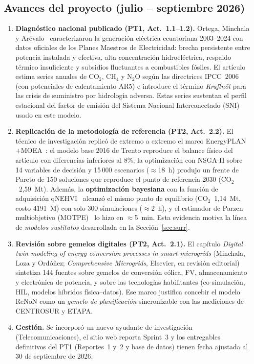 \documentclass[11pt,a4paper]{article}
\newcommand{\CO}{CO$_2$}
\begin{document}
\subsection{Avances del proyecto (julio -- septiembre 2026)}
\begin{enumerate}[leftmargin=1.6em]
  \item \textbf{Diagn\'ostico nacional publicado (PT1, Act.~1.1--1.2).} Ortega, Minchala y
  Ar\'evalo~\cite{ortega2026} caracterizaron la generaci\'on el\'ectrica ecuatoriana
  2003--2024 con datos oficiales de los Planes Maestros de Electricidad: brecha persistente
  entre potencia instalada y efectiva, alta concentraci\'on hidroel\'ectrica, respaldo
  t\'ermico insuficiente y subsidios fluctuantes a combustibles f\'osiles. El art\'iculo
  estima series anuales de \CO, CH$_4$ y N$_2$O seg\'un las directrices IPCC~2006 (con
  potenciales de calentamiento AR5) e introduce el t\'ermino \emph{Kraftn\=ot} para las
  crisis de suministro por hidrolog\'ia adversa. Estas series sustentan el perfil
  estacional del factor de emisi\'on del Sistema Nacional Interconectado (SNI) usado en
  este modelo.
  \item \textbf{Replicaci\'on de la metodolog\'ia de referencia (PT2, Act.~2.2).} El
  t\'ecnico de investigaci\'on replic\'o de extremo a extremo el marco
  EnergyPLAN$+$MOEA~\cite{loza2026,lund2021}: el modelo base 2016 de Trento reproduce el
  balance f\'isico del art\'iculo con diferencias inferiores al 8\%; la optimizaci\'on con
  NSGA-II sobre 14 variables de decisi\'on y 15\,000 escenarios ($\approx$18~h) produjo un
  frente de Pareto de 150 soluciones que reproduce el punto de referencia 2030
  (\CO\ 2,59~Mt). Adem\'as, la \textbf{optimizaci\'on bayesiana} con la funci\'on de
  adquisici\'on qNEHVI~\cite{daulton2021} alcanz\'o el mismo punto de equilibrio
  (\CO\ 1,14~Mt, costo 4191~M\texteuro{}) con solo 300 simulaciones ($\approx$2~h), y el estimador
  de Parzen multiobjetivo (MOTPE)~\cite{ozaki2020} lo hizo en $\approx$5~min. Esta
  evidencia motiva la l\'inea de \emph{modelos sustitutos} desarrollada en la
  Secci\'on~\ref{sec:surr}.
  \item \textbf{Revisi\'on sobre gemelos digitales (PT2, Act.~2.1).} El cap\'itulo
  \emph{Digital twin modeling of energy conversion processes in smart microgrids}
  (Minchala, Loza y Ord\'o\~nez; \emph{Comprehensive Microgrids}, Elsevier, en revisi\'on
  editorial) sintetiza 144 fuentes sobre gemelos de conversi\'on e\'olica, FV,
  almacenamiento y electr\'onica de potencia, y sobre las tecnolog\'ias habilitantes
  (co-simulaci\'on, HIL, modelos h\'ibridos f\'isica--datos). Ese marco justifica concebir
  el modelo ReNoN como un \emph{gemelo de planificaci\'on} sincronizable con las
  mediciones de CENTROSUR y ETAPA.
  \item \textbf{Gesti\'on.} Se incorpor\'o un nuevo ayudante de investigaci\'on
  (Telecomunicaciones), el sitio web reporta Sprint~3 y los entregables definitivos del
  PT1 (Reportes~1 y~2 y base de datos) tienen fecha ajustada al 30 de septiembre de 2026.
\end{enumerate}
\end{document}
